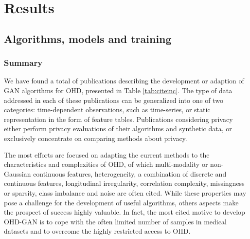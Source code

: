 \section{Results}
    \subsection{Algorithms, models and training}
        \subsubsection{Summary}
        We have found a total of \todo publications describing the development or adaption of GAN algorithms for OHD, presented in Table \ref{tab:citeinc}. The type of data addressed in each of these publications can be generalized into one of two categories: time-dependent observations, such as time-series, or static representation in the form of feature tables. Publications considering privacy either perform privacy evaluations of their algorithms and synthetic data, or exclusively concentrate on comparing methods about privacy.
        
        \todo%
        \todo%
        
        The most efforts are focused on adapting the current methods to the characteristics and complexities of OHD, of which multi-modality or non-Gaussian continuous features, heterogeneity, a combination of discrete and continuous features, longitudinal irregularity, correlation complexity, missingness or sparsity, class imbalance and noise are often cited. While these properties may pose a challenge for the development of useful algorithms, others aspects make the prospect of success highly valuable. In fact, the most cited motive to develop OHD-GAN is to cope with the often limited number of samples in medical datasets and to overcome the highly restricted access to OHD.\par


       



